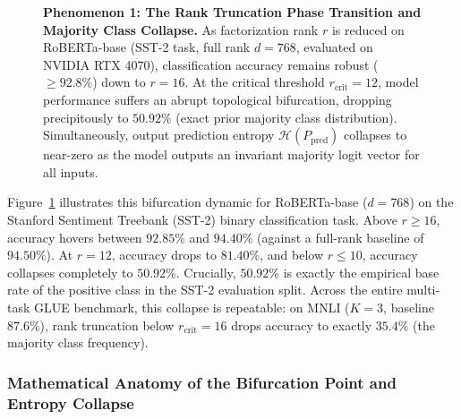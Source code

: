 \begin{figure}[t]
{
}
\caption[Phenomenon 1]{\textbf{Phenomenon 1: The Rank Truncation Phase Transition and Majority Class Collapse.} As factorization rank $r$ is reduced on RoBERTa-base (SST-2 task, full rank $d=768$, evaluated on NVIDIA RTX 4070), classification accuracy remains robust ($\ge 92.8\%$) down to $r=16$. At the critical threshold $r_{\text{crit}} = 12$, model performance suffers an abrupt topological bifurcation, dropping precipitously to $50.92\%$ (exact prior majority class distribution). Simultaneously, output prediction entropy $\mathcal{H}(P_{\text{pred}})$ collapses to near-zero as the model outputs an invariant majority logit vector for all inputs.}
\label{fig:phenom1_rank_phase_transition}
\end{figure}

Figure~\ref{fig:phenom1_rank_phase_transition} illustrates this bifurcation dynamic for RoBERTa-base ($d=768$) on the Stanford Sentiment Treebank (SST-2) binary classification task. Above $r \ge 16$, accuracy hovers between $92.85\%$ and $94.40\%$ (against a full-rank baseline of $94.50\%$). At $r = 12$, accuracy drops to $81.40\%$, and below $r \le 10$, accuracy collapses completely to $50.92\%$. Crucially, $50.92\%$ is exactly the empirical base rate of the positive class in the SST-2 evaluation split. Across the entire multi-task GLUE benchmark, this collapse is repeatable: on MNLI ($K=3$, baseline $87.6\%$), rank truncation below $r_{\text{crit}} = 16$ drops accuracy to exactly $35.4\%$ (the majority class frequency).

\subsubsection{Mathematical Anatomy of the Bifurcation Point and Entropy Collapse}
\label{sec:phenom_rank_bifurcation}

